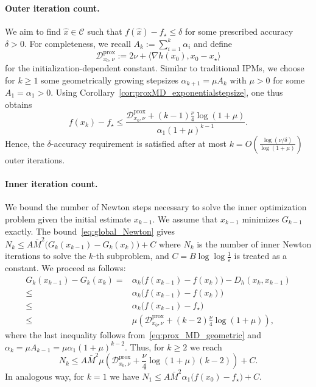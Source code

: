 \documentclass[a4paper]{article}
\renewcommand{\leq}{\leqslant}
\renewcommand{\geq}{\geqslant}
\newcommand{\CC}{\mathcal{C}}
\newcommand{\coloneqq}{:=}
\newcommand{\ip}[2]{\langle #1, #2\rangle}
\renewcommand{\epsilon}{\varepsilon}
\newcommand{\Dxzero}{\mathcal{D}_{x_0,\nu}}
\newcommand{\Dxzeroprox}{\Dxzero^{\mathrm{prox}}}
\begin{document}
\paragraph{Outer iteration count.}
We aim to find $\hat{x}\in\CC$ such that $f(\hat{x})-f_\star\leq \delta$ for some prescribed accuracy $\delta>0$.
For completeness, we recall $A_k \coloneqq \sum_{i=1}^{k}\alpha_i$ and define
\begin{equation}\label{eq:Dxzeroprox}
        \Dxzeroprox \coloneqq 2\nu + \ip{\nabla h(x_0)}{ x_0-x_\star}
\end{equation}
for the initialization-dependent constant.
Similar to traditional IPMs, we choose for $k\geq 1$ some geometrically growing stepsizes $\alpha_{k+1}=\mu A_k$ with $\mu>0$ for some $A_1=\alpha_1>0$.
Using Corollary~\ref{cor:proxMD_exponentialstepsize}, one thus obtains
\begin{equation}\label{eq:prox_MD_geometric}
        f(x_k)-f_\star
        \leq
        \frac{ \Dxzeroprox + (k-1)\frac \nu 4\log(1+\mu)}{\alpha_1(1+\mu)^{k-1}}.
\end{equation}
Hence, the $\delta$-accuracy requirement is satisfied after at most
$ k = O\left(\frac{\log(\nu/\delta)}{\log(1+\mu)}\right)$ outer iterations.

\paragraph{Inner iteration count.}
We bound the number of Newton steps necessary to solve the inner optimization problem given the initial estimate $x_{k-1}$.
We assume that $x_{k-1}$ minimizes $G_{k-1}$ exactly.
The bound~\eqref{eq:global_Newton} gives
$N_k \leq A\bar M^2\bigl(G_k(x_{k-1})-G_k(x_k)\bigr)+C$
where $N_k$ is the number of inner Newton iterations to solve the $k$-th subproblem,
and $C=B\log\log\frac1\epsilon$ is treated as a constant.
We proceed as follows:
\begin{align*}
G_k(x_{k-1})-G_k(x_k)
={}&
\alpha_k\bigl(f(x_{k-1})-f(x_k)\bigr) - D_h(x_k,x_{k-1})
\\
\leq{}&
\alpha_k\bigl(f(x_{k-1})-f(x_k)\bigr)
\\
\leq{}&
\alpha_k\bigl(f(x_{k-1})-f_\star\bigr)
\\
\leq{}&
\mu \left(\Dxzeroprox + (k-2)\frac \nu 4\log(1+\mu)\right)
,
\end{align*}
where the last inequality follows from~\eqref{eq:prox_MD_geometric} and $\alpha_k = \mu A_{k-1} = \mu \alpha_1 (1+\mu)^{k-2}$.
Thus, for $k\geq 2$ we reach
\[
N_k \leq A\bar{M}^2 \mu \left(\Dxzeroprox + \frac{\nu}{4} \log(1+\mu)(k-2)\right) + C.
\]
In analogous way, for $k=1$ we have $N_1 \leq A\bar{M}^2 \alpha_1 \bigl(f(x_0)-f_\star\bigr) + C$.
\end{document}
